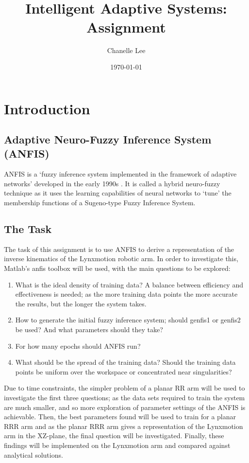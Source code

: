 \documentclass[11.5pt, twoside, a4paper]{article}
\begin{document}
\title{Intelligent Adaptive Systems: Assignment}
\author{Chanelle Lee}
\date{\today}
\maketitle

\section{Introduction}

\subsection{Adaptive Neuro-Fuzzy Inference System (ANFIS)} %
ANFIS is a `fuzzy inference system implemented in the framework of adaptive networks' developed in the early 1990s \cite{JangANFIS}. It is called a hybrid neuro-fuzzy technique as it uses the learning capabilities of neural networks to `tune' the membership functions of a Sugeno-type Fuzzy Inference System. 

\subsection{The Task}
The task of this assignment is to use ANFIS to derive a representation of the inverse kinematics of the Lynxmotion robotic arm. In order to investigate this, Matlab's anfis toolbox will be used, with the main questions to be explored:
\begin{enumerate}
\item What is the ideal density of training data? A balance between efficiency and effectiveness is needed; as the more training data points the more accurate the results, but the longer the system takes.
\item How to generate the initial fuzzy inference system; should genfis1 or genfis2 be used? And what parameters should they take?
\item For how many epochs should ANFIS run?
\item What should be the spread of the training data? Should the training data points be uniform over the workspace or concentrated near singularities?
\end{enumerate}

 Due to time constraints, the simpler problem of a planar RR arm will be used to investigate the first three questions; as the data sets required to train the system are much smaller, and so more exploration of parameter settings of the ANFIS is achievable. Then, the best parameters found will be used to train for a planar RRR arm and as the planar RRR arm gives a representation of the Lynxmotion arm in the XZ-plane, the final question will be investigated. Finally, these findings will be implemented on the Lynxmotion arm and compared against analytical solutions.
\end{document}
